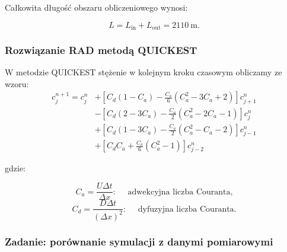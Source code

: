 \documentclass[
  polish,
  letterpaper,
  DIV=11,
  numbers=noendperiod]{scrartcl}
\begin{document}
Całkowita długość obszaru obliczeniowego wynosi:

\[
L=L_{\mathrm{in}}+L_{\mathrm{out}}=2110\ \mathrm{m}.
\]

\subsubsection{Rozwiązanie RAD metodą
QUICKEST}\label{rozwiux105zanie-rad-metodux105-quickest}

W metodzie QUICKEST stężenie w kolejnym kroku czasowym obliczamy ze
wzoru: \[
\begin{aligned}
    c_j^{n+1}=c_j^n &+\left[C_d(1-C_a)-\frac{C_a}{6} (C_a^2-3C_a+2)\right]c_{j+1}^n\\
                    &-\left[C_d(2-3C_a)-\frac{C_a}{2}(C_a^2-2C_a-1)\right]c_j^n\\
                    &+\left[C_d(1-3C_a)-\frac{C_a}{2}(C_a^2-C_a-2)\right]c_{j-1}^n\\
                    &+\left[C_dC_a+\frac{C_a}{6}(C_a^2-1)\right]c_{j-2}^n
\end{aligned}
\]

gdzie:

\[
C_a=\frac{U\Delta t}{\Delta x}: \quad \text{ adwekcyjna liczba Couranta,}
\] \[
C_d=\frac{D\Delta t}{(\Delta x)^2}: \quad \text{ dyfuzyjna liczba Couranta.}
\]

\subsubsection{Zadanie: porównanie symulacji z danymi
pomiarowymi}\label{zadanie-poruxf3wnanie-symulacji-z-danymi-pomiarowymi}
\end{document}
